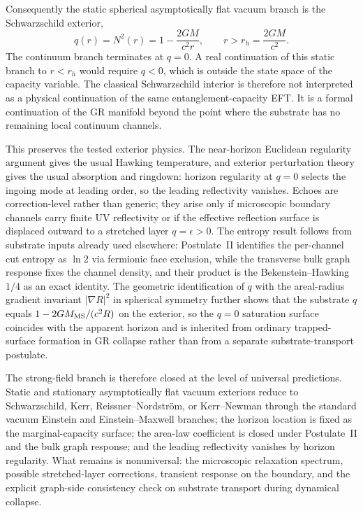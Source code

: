 \documentclass[11pt]{article}
\begin{document}
Consequently the static spherical asymptotically flat vacuum branch is the Schwarzschild exterior,
\[
q(r)=N^2(r)=1-\frac{2GM}{c^2r},
\qquad
r>r_h=\frac{2GM}{c^2}.
\]
The continuum branch terminates at $q=0$. A real continuation of this static branch to $r<r_h$ would require $q<0$, which is outside the state space of the capacity variable. The classical Schwarzschild interior is therefore not interpreted as a physical continuation of the same entanglement-capacity EFT. It is a formal continuation of the GR manifold beyond the point where the substrate has no remaining local continuum channels.

This preserves the tested exterior physics. The near-horizon Euclidean regularity argument gives the usual Hawking temperature, and exterior perturbation theory gives the usual absorption and ringdown: horizon regularity at $q=0$ selects the ingoing mode at leading order, so the leading reflectivity vanishes. Echoes are correction-level rather than generic; they arise only if microscopic boundary channels carry finite UV reflectivity or if the effective reflection surface is displaced outward to a stretched layer $q=\epsilon>0$. The entropy result follows from substrate inputs already used elsewhere: Postulate~II identifies the per-channel cut entropy as $\ln 2$ via fermionic face exclusion, while the transverse bulk graph response fixes the channel density, and their product is the Bekenstein--Hawking $1/4$ as an exact identity. The geometric identification of $q$ with the areal-radius gradient invariant $|\nabla R|^2$ in spherical symmetry further shows that the substrate $q$ equals $1-2GM_{\rm MS}/(c^2R)$ on the exterior, so the $q=0$ saturation surface coincides with the apparent horizon and is inherited from ordinary trapped-surface formation in GR collapse rather than from a separate substrate-transport postulate.

The strong-field branch is therefore closed at the level of universal predictions. Static and stationary asymptotically flat vacuum exteriors reduce to Schwarzschild, Kerr, Reissner--Nordstr\"om, or Kerr--Newman through the standard vacuum Einstein and Einstein--Maxwell branches; the horizon location is fixed as the marginal-capacity surface; the area-law coefficient is closed under Postulate~II and the bulk graph response; and the leading reflectivity vanishes by horizon regularity. What remains is nonuniversal: the microscopic relaxation spectrum, possible stretched-layer corrections, transient response on the boundary, and the explicit graph-side consistency check on substrate transport during dynamical collapse.
\end{document}
